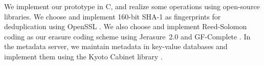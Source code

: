 We implement our prototype in C, and realize some operations using open-source
libraries.  We choose and implement 160-bit SHA-1 as fingerprints for
deduplication using OpenSSL \cite{openssl}.  We also choose and implement
Reed-Solomon coding \cite{reed60} as our erasure coding scheme using
Jerasure~2.0 \cite{pg:14:jer} and GF-Complete \cite{pmg:13:gfc10}.  In the
metadata server, we maintain metadata in key-value databases and implement
them using the Kyoto Cabinet library \cite{kyotocab}. 




